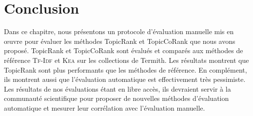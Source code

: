     \TODO{\dots}


  \section{Conclusion}
  \label{sec:main-automatic_evaluation_of_keyphrase_annotation-Conclusion}
    Dans ce chapitre, nous présentons un protocole d'évaluation manuelle mis en
    \oe{}uvre pour évaluer les méthodes TopicRank et TopicCoRank que nous avons
    proposé. TopicRank et TopicCoRank sont évalués et comparés aux méthodes de
    référence \textsc{Tf-Idf} et \textsc{Kea} sur les collections de Termith.
    Les résultats montrent que TopicRank  sont plus
    performants que les méthodes de référence. En complément, ils montrent aussi
    que l'évaluation automatique est effectivement très pessimiste. Les
    résultats de nos évaluations étant en libre accès, ils devraient servir à la
    communauté scientifique pour proposer de nouvelles méthodes d'évaluation
    automatique et mesurer leur corrélation avec l'évaluation manuelle.

